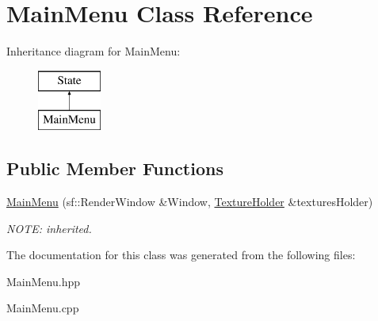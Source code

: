 \hypertarget{class_main_menu}{\section{Main\-Menu Class Reference}
\label{class_main_menu}
}
Inheritance diagram for Main\-Menu\-:\begin{figure}[H]
\begin{center}
\leavevmode
\includegraphics[height=2.000000cm]{class_main_menu}
\end{center}
\end{figure}
\subsection*{Public Member Functions}
\begin{DoxyCompactItemize}
\item 
\hypertarget{class_main_menu_a9b9354471b9401a72a9b0c259331f6c0}{\hyperlink{class_main_menu_a9b9354471b9401a72a9b0c259331f6c0}{Main\-Menu} (sf\-::\-Render\-Window \&Window, \hyperlink{class_texture_holder}{Texture\-Holder} \&textures\-Holder)}\label{class_main_menu_a9b9354471b9401a72a9b0c259331f6c0}

\begin{DoxyCompactList}\small\item\em N\-O\-T\-E\-: inherited. \end{DoxyCompactList}\end{DoxyCompactItemize}


The documentation for this class was generated from the following files\-:\begin{DoxyCompactItemize}
\item 
Main\-Menu.\-hpp\item 
Main\-Menu.\-cpp\end{DoxyCompactItemize}
